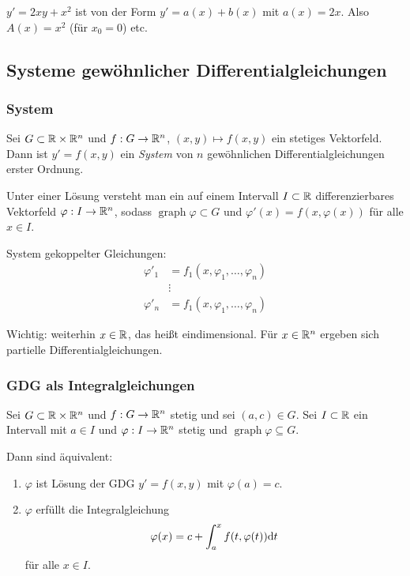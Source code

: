 \begin{exmp}
  $y' = 2xy + x^2$ ist von der Form $y'=a(x)+b(x)$ mit $a(x) = 2x$. Also $A(x) =
  x^2$ (für $x_0=0$) etc.
\end{exmp}

\subsection{Systeme gewöhnlicher Differentialgleichungen}
\subsubsection{System}  
\begin{defn}
  Sei $G \subset \mathbb{R} \times \mathbb{R}^n$ und $f:G \to \mathbb{R}^n$, $(x,y) \mapsto
  f(x,y)$ ein stetiges Vektorfeld. Dann ist $y'=f(x,y)$ ein \emph{System} von
  $n$ gewöhnlichen Differentialgleichungen erster Ordnung.

  Unter einer Lösung versteht man ein auf einem Intervall $I \subset \mathbb{R}$
  differenzierbares Vektorfeld $\varphi:I \to \mathbb{R}^n$, sodass
  $\operatorname{graph} \varphi \subset G$ und $\varphi'(x) = f(x,\varphi(x))$
  für alle $x \in I$.

  System gekoppelter Gleichungen:
  \begin{align*}
    \varphi'_1 &= f_1(x, \varphi_1, \ldots, \varphi_n) \\
               &\vdots \\
    \varphi'_n &= f_1(x, \varphi_1, \ldots, \varphi_n)
  \end{align*}

  Wichtig: weiterhin $x \in \mathbb{R}$, das heißt eindimensional. Für $x \in
  \mathbb{R}^n$ ergeben sich partielle Differentialgleichungen.
\end{defn}

\subsubsection{GDG als Integralgleichungen}
\begin{thm}
  Sei $G \subset \mathbb{R} \times \mathbb{R}^n$ und $f:G \to \mathbb{R}^n$ stetig und sei
  $(a,c) \in G$. Sei $I \subset \mathbb{R}$ ein Intervall mit $a \in I$ und $\varphi:
  I \to \mathbb{R}^n$ stetig und $\operatorname{graph} \varphi \subseteq G$.

  Dann sind äquivalent:
  \begin{enumerate}[1)]
  \item $\varphi$ ist Lösung der GDG $y'=f(x,y)$ mit $\varphi(a) = c$.
  \item $\varphi$ erfüllt die Integralgleichung
    \[ \varphi(x) = c + \int_a^x f(t, \varphi(t)) \mathrm{d} t \]
    für alle $x \in I$.
  \end{enumerate}
\end{thm}

